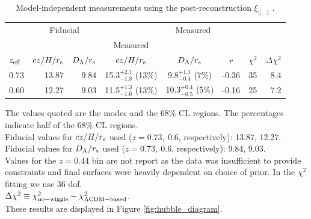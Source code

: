 \documentclass[iop,twocolappendix]{emulateapj}
\newcommand{\red}{\color{red}}
\begin{document}
\begin{table}
\begin{centering}
\caption{Model-independent measurements using the post-reconstruction $\xi_{||,\perp}$.}
\label{tab:hda_wigglez_reconstructed}
\begin{tabular}{ l | r | r | c | c | c | c | r }
\hline
              & \multicolumn{2}{c}{Fiducial} & \multicolumn{5}{c}{Measured} \\  
              &  & & Measured & & & & \\
$z_{\rm eff}$ & $cz/H/r_{\rm s}$ & $D_{\rm A}/r_{\rm s}$  & $cz/H/r_{\rm s}$ & $D_{\rm A}/r_{\rm s}$  & $r$ & $\chi^2$ & $\Delta\chi^2$ \\
\hline
  0.73  & 13.87 & 9.84 & 15.3$^{+2.1}_{-1.8}$ (13\%)  &  9.8$^{+1.1}_{-0.4}$ (7\%)   & -0.36  & 35 & 8.4 \\
  0.60  & 12.27 & 9.03 & 11.5$^{+1.3}_{-1.6}$ (13\%)  & 10.3$^{+0.4}_{-0.5}$ (5\%)   & -0.16  & 25 & 7.2 \\
\end{tabular}

\medskip
The values quoted are the modes and the $68\%$ CL regions. The percentages indicate half of the $68\%$ CL regions. \\
Fiducial values for $cz/H/r_{\rm s}$ used ($z=0.73,\ 0.6$, respectively): 13.87, 12.27. \\
Fiducial values for $D_{\rm A}/r_{\rm s}$ used ($z=0.73,\ 0.6$, respectively): 9.84, 9.03.\\
Values for the $z=0.44$ bin are not report as the data was insufficient to provide constraints and final surfaces were heavily dependent on choice of prior.
In the $\chi^2$ fitting we use 36 dof. \\
$\Delta\chi^2\equiv \chi^2_{\rm no-wiggle} - \chi^2_{\rm \Lambda CDM-based}$. \\
These results are displayed in Figure \ref{fig:hubble_diagram}. \\
\end{centering}
\end{table}
\end{document}
